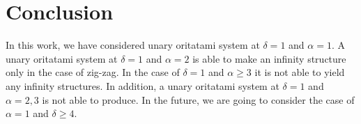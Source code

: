 \section{Conclusion}
In this work, we have considered unary oritatami system at $\delta = 1$ and $\alpha = 1$.
A unary oritatami system at $\delta = 1$ and $\alpha = 2$ is able to make an infinity structure only in the case of zig-zag.
In the case of $\delta = 1$ and $\alpha \geq 3$ it is not able to yield any infinity structures.
In addition, a unary oritatami system at $\delta = 1$ and $\alpha = 2,3$ is not able to produce.
In the future, we are going to consider the case of $\alpha = 1$ and $\delta \geq 4$.